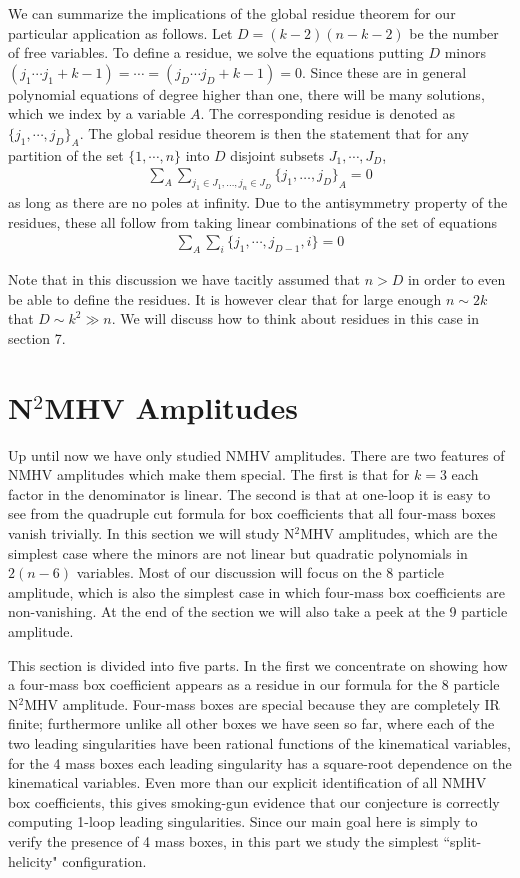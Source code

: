\documentclass[12pt]{article}
\newcommand{\be}{\begin{eqnarray}}
\newcommand{\ee}{\end{eqnarray}}
\begin{document}
We can summarize the implications of the global residue theorem for
our particular application as follows. Let $D = (k-2)(n-k-2)$ be the
number of free variables. To define a residue, we solve the
equations putting $D$ minors $(j_1 \cdots j_1 + k -1) = \cdots =(j_D
\cdots j_D + k - 1)=0$. Since these are in general polynomial
equations of degree higher than one, there will be many solutions,
which we index by a variable $A$. The corresponding residue is
denoted as $\{j_1, \cdots, j_D\}_A$. The global residue theorem is
then the statement that for any partition of the set $\{ 1,
\cdots,n\}$ into $D$ disjoint subsets $J_1, \cdots,J_D$, \be \sum_A
\sum_{j_1\in J_1,\ldots, j_n\in J_D} {\{j_1,\ldots ,j_D\}}_A = 0 \ee
as long as there are no poles at infinity. Due to the antisymmetry
property of the residues, these all follow from taking linear
combinations of the set of equations \be \sum_A \sum_i \{j_1,
\cdots, j_{D-1}, i\} = 0 \ee

Note that in this discussion we have tacitly assumed that $n > D$ in
order to even be able to define the residues. It is however clear
that for large enough $n \sim 2k$ that $D \sim k^2 \gg n$. We will
discuss how to think about residues in this case in section 7.

\section{N$^2$MHV Amplitudes}

Up until now we have only studied NMHV amplitudes. There are two
features of NMHV amplitudes which make them special. The first is
that for $k=3$ each factor in the denominator is linear. The second
is that at one-loop it is easy to see from the quadruple cut formula
for box coefficients that all four-mass boxes vanish trivially. In
this section we will study N$^2$MHV amplitudes, which are the
simplest case where the minors are not linear but quadratic
polynomials in $2(n-6)$ variables. Most of our discussion will focus
on the 8 particle amplitude, which is also the simplest case in
which four-mass box coefficients are non-vanishing. At the end of
the section we will also take a peek at the 9 particle amplitude.

This section is divided into five parts. In the first we concentrate
on showing how a four-mass box coefficient appears as a residue in
our formula for the 8 particle N$^2$MHV amplitude. Four-mass boxes
are special because they are completely IR finite; furthermore
unlike all other boxes we have seen so far, where each of the two
leading singularities have been rational functions of the
kinematical variables, for the 4 mass boxes each leading singularity
has a square-root dependence on the kinematical variables. Even more
than our explicit identification of all NMHV box coefficients, this
gives smoking-gun evidence that our conjecture is correctly
computing 1-loop leading singularities. Since our main goal here is
simply to verify the presence of 4 mass boxes, in this part we
study the simplest ``split-helicity" configuration.
\end{document}
